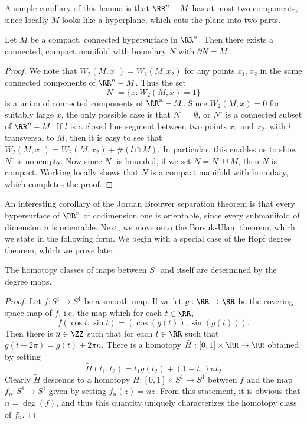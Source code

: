A simple corollary of this lemma is that $\RR^n - M$ has at most two components, since locally $M$ looks like a hyperplane, which cuts the plane into two parts.

\begin{theorem}
    Let $M$ be a compact, connected hypersurface in $\RR^n$. Then there exists a connected, compact manifold with boundary $N$ with $\partial N = M$.
\end{theorem}
\begin{proof}
    We note that $W_2(M,x_1) = W_2(M,x_2)$ for any points $x_1,x_2$ in the same connected components of $\RR^n - M$. Thus the set
    \[ N^\circ = \{ x : W_2(M,x) = 1 \} \]
    is a union of connected components of $\RR^n - M$. Since $W_2(M,x) = 0$ for suitably large $x$, the only possible case is that $N^\circ = \emptyset$, or $N^\circ$ is a connected subset of $\RR^n - M$. If $l$ is a closed line segment between two points $x_1$ and $x_2$, with $l$ transversal to $M$, then it is easy to see that $W_2(M,x_1) = W_2(M,x_2) + \#(l \cap M)$. In particular, this enables us to show $N^\circ$ is nonempty. Now since $N^\circ$ is bounded, if we set $N = N^\circ \cup M$, then $N$ is compact. Working locally shows that $N$ is a compact manifold with boundary, which completes the proof.
\end{proof}

An interesting corollary of the Jordan Brouwer separation theorem is that every hypersurface of $\RR^n$ of codimension one is orientable, since every submanifold of dimension $n$ is orientable. Next, we move onto the Borsuk-Ulam theorem, which we state in the following form. We begin with a special case of the Hopf degree theorem, which we prove later.

\begin{lemma}
    The homotopy classes of maps between $S^1$ and itself are determined by the degree maps.
\end{lemma}
\begin{proof}
    Let $f: S^1 \to S^1$ be a smooth map. If we let $g: \RR \to \RR$ be the covering space map of $f$, i.e. the map which for each $t \in \RR$,
    \[ f(\cos t, \sin t) = (\cos(g(t)), \sin(g(t))). \]
    Then there is $n \in \ZZ$ such that for each $t \in \RR$ such that $g(t + 2\pi) = g(t) + 2 \pi n$. There is a homotopy $\tilde{H}: [0,1] \times \RR \to \RR$ obtained by setting
    \[ \tilde{H}(t_1,t_2) = t_1 g(t_2) + (1 - t_1) n t_2 \]
    Clearly $\tilde{H}$ descends to a homotopy $H: [0,1] \times S^1 \to S^1$ between $f$ and the map $f_n : S^1 \to S^1$ given by setting $f_n(z) = nz$. From this statement, it is obvious that $n = \deg(f)$, and thus this quantity uniquely characterizes the homotopy class of $f_n$.
\end{proof}

